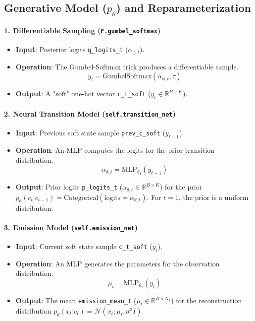 \documentclass[11pt, a4paper]{article}
\begin{document}
\subsection{Generative Model ($p_{\theta}$) and Reparameterization}

\paragraph{1. Differentiable Sampling (\texttt{F.gumbel\_softmax})}
\begin{itemize}
    \item \textbf{Input}: Posterior logits \texttt{q\_logits\_t} ($\alpha_{\phi, t}$).
    \item \textbf{Operation}: The Gumbel-Softmax trick produces a differentiable sample.
        \[ y_t = \text{GumbelSoftmax}(\alpha_{\phi, t}, \tau) \]
    \item \textbf{Output}: A "soft" one-hot vector \texttt{c\_t\_soft} ($y_t \in \mathbb{R}^{B \times K}$).
\end{itemize}

\paragraph{2. Neural Transition Model (\texttt{self.transition\_net})}
\begin{itemize}
    \item \textbf{Input}: Previous soft state sample \texttt{prev\_c\_soft} ($y_{t-1}$).
    \item \textbf{Operation}: An MLP computes the logits for the prior transition distribution.
        \[ \alpha_{\theta, t} = \text{MLP}_{\theta_1}(y_{t-1}) \]
    \item \textbf{Output}: Prior logits \texttt{p\_logits\_t} ($\alpha_{\theta, t} \in \mathbb{R}^{B \times K}$) for the prior $p_{\theta}(c_t | c_{t-1}) = \text{Categorical}(\text{logits}=\alpha_{\theta, t})$. For $t=1$, the prior is a uniform distribution.
\end{itemize}

\paragraph{3. Emission Model (\texttt{self.emission\_net})}
\begin{itemize}
    \item \textbf{Input}: Current soft state sample \texttt{c\_t\_soft} ($y_t$).
    \item \textbf{Operation}: An MLP generates the parameters for the observation distribution.
        \[ \mu_t = \text{MLP}_{\theta_2}(y_t) \]
    \item \textbf{Output}: The mean \texttt{emission\_mean\_t} ($\mu_t \in \mathbb{R}^{B \times N_f}$) for the reconstruction distribution $p_{\theta}(x_t | c_t) = \mathcal{N}(x_t; \mu_t, \sigma^2 I)$.
\end{itemize}
\end{document}
